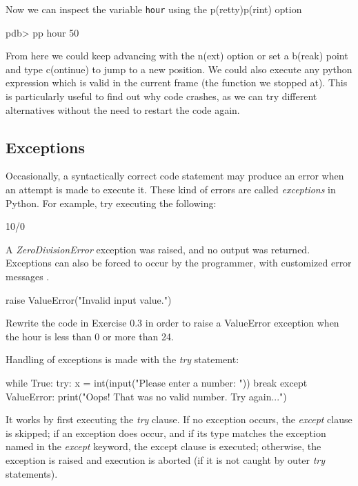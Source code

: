 \noindent Now we can inspect the variable \texttt{hour} using the p(retty)p(rint) option

\begin{python}
pdb> pp hour
50
\end{python}

From here we could keep advancing with the n(ext) option or set a b(reak) point
and type c(ontinue) to jump to a new position. We could also execute any python
expression which is valid in the current frame (the function we stopped at).
This is particularly useful to find out why code crashes, as we can try
different alternatives without the need to restart the code again.

\subsection{Exceptions}

Occasionally, a syntactically correct code statement may produce an error when
an attempt is made to execute it. These kind of errors are called
\textit{exceptions} in Python. For example, try executing the following:

\begin{python}
10/0
\end{python}

A \textit{ZeroDivisionError} exception was raised, and no output was returned.
Exceptions can also be forced to occur by the programmer, with customized error
messages \footnotemark{}.

\begin{python}
raise ValueError("Invalid input value.")
\end{python}

\begin{exercise}
Rewrite the code in Exercise 0.3 in order to raise a ValueError exception when
the hour is less than 0 or more than 24.  \end{exercise}

\noindent Handling of exceptions is made with the \textit{try} statement:

\begin{python}
while True:
    try:
        x = int(input("Please enter a number: "))
        break
    except ValueError:
        print("Oops! That was no valid number. Try again...")
\end{python}

It works by first executing the \textit{try} clause. If no exception occurs, the \textit{except} clause is skipped; if an exception does occur, and if its type matches the exception named in the \textit{except} keyword, the except clause is executed; otherwise, the exception is raised and execution is aborted (if it is not caught by outer \textit{try} statements).


